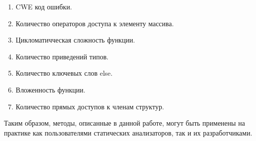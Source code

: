 \begin{enumerate}
    \item CWE код ошибки.
    \item Количество операторов доступа к элементу массива.
    \item Цикломатичческая сложность функции.
    \item Количество приведений типов.
    \item Количество ключевых слов else.
    \item Вложенность функции.
    \item Количество прямых доступов к членам структур.
\end{enumerate}

Таким образом, методы, описанные в данной работе, могут быть применены на практике как пользователями статических анализаторов, так и их разработчиками.

\newpage